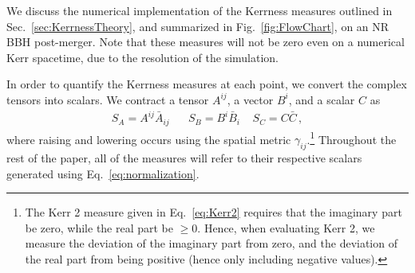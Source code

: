 We discuss the numerical implementation of the Kerrness measures outlined in Sec.~\ref{sec:KerrnessTheory}, and summarized in Fig.~\ref{fig:FlowChart}, on an NR BBH post-merger. Note that these measures will not be zero even on a numerical Kerr spacetime, due to the resolution of the simulation. 

\ConvergenceTestFigure


In order to quantify the Kerrness measures at each point, we convert the complex tensors into scalars. We contract a tensor $A^{ij}$, a vector $B^i$, and a scalar $C$ as
\begin{align}
\label{eq:normalization}
S_A = A^{ij}\bar{A}_{ij} \;\;\;\;\;\; S_B = B^{i}\bar{B}_i \;\;\;\; S_C = C\bar{C}\,,
\end{align} where raising and lowering occurs using the spatial metric $\gamma_{ij}$.\footnote{The Kerr 2 measure given in Eq.~\eqref{eq:Kerr2} requires that the imaginary part be zero, while the real part be $\geq 0$. Hence, when evaluating Kerr 2, we measure the deviation of the imaginary part from zero, and the deviation of the real part from being positive (hence only including negative values).} Throughout the rest of the paper, all of the measures will refer to their respective scalars generated using Eq.~\eqref{eq:normalization}. 



